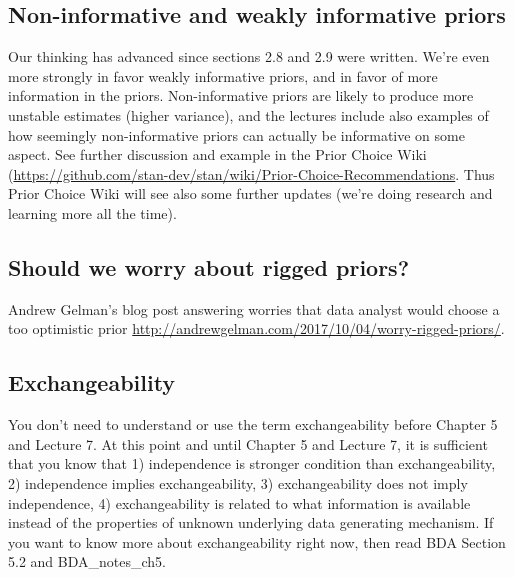 \documentclass[a4paper,11pt,english]{article}
\begin{document}
\subsection*{Non-informative and weakly informative priors}

Our thinking has advanced since sections 2.8 and 2.9 were written. We're even more strongly in favor weakly informative priors, and in favor of more information in the priors. Non-informative priors are likely to produce more unstable estimates (higher variance), and the lectures include also examples of how seemingly non-informative priors can actually be informative on some aspect. See further discussion and example in the Prior
Choice Wiki
(\url{https://github.com/stan-dev/stan/wiki/Prior-Choice-Recommendations}. Thus Prior Choice Wiki will see also some further updates (we're doing research and learning more all the time).

\subsection*{Should we worry about rigged priors?}

Andrew Gelman's blog post answering worries that data analyst would
choose a too optimistic prior
\url{http://andrewgelman.com/2017/10/04/worry-rigged-priors/}.

\subsection*{Exchangeability}

You don't need to understand or use the term exchangeability before
Chapter 5 and Lecture 7. At this point and until Chapter 5 and Lecture
7, it is sufficient that you know that 1) independence is stronger
condition than exchangeability, 2) independence implies
exchangeability, 3) exchangeability does not imply independence, 4)
exchangeability is related to what information is available instead of
the properties of unknown underlying data generating mechanism.  If
you want to know more about exchangeability right now, then read BDA
Section 5.2 and BDA\_notes\_ch5.
\end{document}
